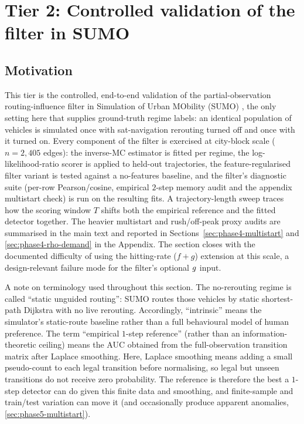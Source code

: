 \section{Tier 2: Controlled validation of the filter in SUMO}
\label{sec:phase4-sumo}

\subsection{Motivation}

This tier is the controlled, end-to-end validation of the
partial-observation routing-influence filter in Simulation of Urban
MObility (SUMO) \cite{lopez2018}, the only setting here that supplies
ground-truth regime labels: an
identical population of vehicles is simulated once with sat-navigation
rerouting turned off and once with it turned on. Every component of the
filter is exercised at city-block scale ($n = 2{,}405$ edges): the
inverse-MC estimator is fitted per regime, the log-likelihood-ratio
scorer is applied to held-out trajectories, the feature-regularised
filter variant is tested against a no-features baseline, and the
filter's diagnostic suite (per-row Pearson/cosine, empirical $2$-step
memory audit and the appendix multistart check) is run on the resulting fits.
A trajectory-length sweep traces how the scoring window $T$ shifts both
the empirical reference and the fitted detector together. The heavier
multistart and rush/off-peak proxy audits are summarised in the main text
and reported in Sections~\ref{sec:phase4-multistart} and
\ref{sec:phase4-rho-demand} in the Appendix. The section closes with the
documented difficulty of using the hitting-rate ($f+g$) extension at this
scale, a design-relevant failure mode for the filter's optional $g$
input.

A note on terminology used throughout this section. The no-rerouting
regime is called ``static unguided routing'': SUMO routes those
vehicles by static shortest-path Dijkstra with no live rerouting.
Accordingly, ``intrinsic'' means the simulator's static-route baseline
rather than a full behavioural model of human preference. The term
``empirical $1$-step reference'' (rather than an
information-theoretic ceiling) means the AUC obtained from the
full-observation transition matrix after Laplace smoothing. Here, Laplace
smoothing means adding a small pseudo-count to each legal transition
before normalising, so legal but unseen transitions do not receive zero
probability. The reference is therefore the best a $1$-step detector can
do given this finite data and smoothing, and finite-sample and
train/test variation can move it (and occasionally produce apparent
anomalies, \cref{sec:phase5-multistart}).

